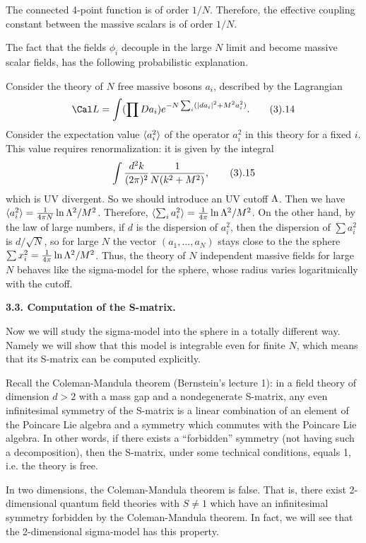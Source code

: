 The connected 4-point function is of order $1/N$. Therefore, the effective 
coupling constant between the massive scalars is of order $1/N$. 

The fact that the fields $\phi_i$ decouple in the large $N$ limit 
and become massive scalar fields, has the following probabilistic 
explanation. 
   
Consider the theory of $N$ free massive bosons $a_i$, described by the 
Lagrangian  
$$
\Cal L=\int (\prod Da_i) e^{-N\sum_i(|da_i|^2+M^2a_i^2)}.\tag 3.14
$$
Consider the expectation value 
$\langle a_i^2\rangle$ of the operator $a_i^2$ in this theory for a fixed $i$. 
This value requires renormalization: it is given by the
integral 
$$
\int \frac{d^2k}{(2\pi)^2}\frac{1}{N(k^2+M^2)},\tag 3.15 
$$
which is UV divergent. So we should introduce an UV cutoff $\Lambda$.
Then we have $\langle a_i^2\rangle= 
\frac{1}{4\pi N}\ln \Lambda^2/M^2$. 
 Therefore, 
$\langle\sum_i a_i^2\rangle=\frac{1}{4\pi}\ln \Lambda^2/M^2$. 
On the other hand, by the law of large numbers, 
if $d$ is the dispersion of $a_i^2$, then the dispersion of
$\sum a_i^2$ is $d/\sqrt{N}$, so for large $N$ the vector 
$(a_1,...,a_N)$ stays close to the the sphere $\sum x_i^2=
\frac{1}{4\pi}\ln \Lambda^2/M^2$. 
Thus, the theory of $N$ independent massive fields for large $N$ 
 behaves like the sigma-model for the sphere, whose radius 
varies logaritmically with the cutoff. 

{\bf 3.3. Computation of the S-matrix.}

Now we will study the sigma-model into the sphere in a totally different way.
Namely we will show that this model is integrable even for finite $N$, 
which means that its S-matrix can be computed explicitly. 

Recall the Coleman-Mandula theorem (Bernstein's lecture 1): in a field theory 
of dimension $d>2$ with a mass gap and a nondegenerate 
S-matrix, any even infinitesimal symmetry of the S-matrix is  
a linear combination of an element 
of the Poincare Lie algebra and a symmetry which commutes with the Poincare
Lie algebra. In other words, if there exists a ``forbidden'' symmetry
(not having such a decomposition), then the S-matrix, under some technical 
conditions, equals 1, i.e. the theory is free. 

In two dimensions, the Coleman-Mandula theorem is false. That is, there 
exist 2-dimensional 
quantum field theories with $S\ne 1$  which have an infinitesimal 
symmetry forbidden by the Coleman-Mandula theorem. 
In fact, we will see that the 2-dimensional sigma-model 
has this property. 


